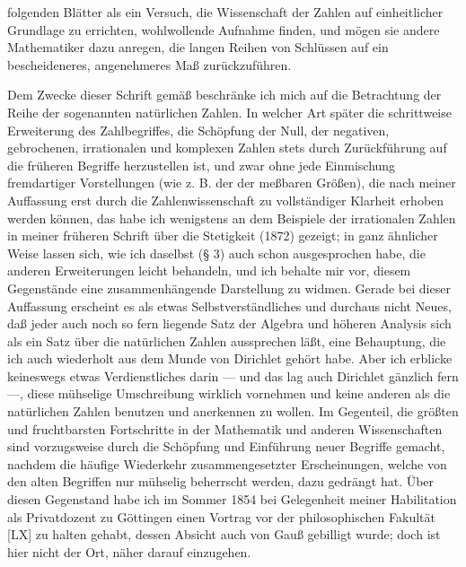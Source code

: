 \documentclass[11pt]{article}
\begin{document}
folgenden Blätter als ein Versuch, die Wissenschaft der Zahlen auf einheitlicher Grundlage zu errichten, wohlwollende Aufnahme finden, und mögen sie andere Mathematiker dazu anregen, die langen Reihen von Schlüssen auf ein bescheideneres, angenehmeres Maß zurückzuführen.

Dem Zwecke dieser Schrift gemäß beschränke ich mich auf die Betrachtung der Reihe der sogenannten natürlichen Zahlen. In welcher Art später die schrittweise Erweiterung des Zahlbegriffes, die Schöpfung der Null, der negativen, gebrochenen, irrationalen und komplexen Zahlen stets durch Zurückführung auf die früheren Begriffe herzustellen ist, und zwar ohne jede Einmischung fremdartiger Vorstellungen (wie z. B. der der meßbaren Größen), die nach meiner Auffassung erst durch die Zahlenwissenschaft zu vollständiger Klarheit erhoben werden können, das habe ich wenigstens an dem Beispiele der irrationalen Zahlen in meiner früheren Schrift über die Stetigkeit (1872) gezeigt; in ganz ähnlicher Weise lassen sich, wie ich daselbst (§ 3) auch schon ausgesprochen habe, die anderen Erweiterungen leicht behandeln, und ich behalte mir vor, diesem Gegenstände eine zusammenhängende Darstellung zu widmen. Gerade bei dieser Auffassung erscheint es als etwas Selbstverständliches und durchaus nicht Neues, daß jeder auch noch so fern liegende Satz der Algebra und höheren Analysis sich als ein Satz über die natürlichen Zahlen aussprechen läßt, eine Behauptung, die ich auch wiederholt aus dem Munde von Dirichlet gehört habe. Aber ich erblicke keineswegs etwas Verdienstliches darin — und das lag auch Dirichlet gänzlich fern —, diese mühselige Umschreibung wirklich vornehmen und keine anderen als die natürlichen Zahlen benutzen und anerkennen zu wollen. Im Gegenteil, die größten und fruchtbarsten Fortschritte in der Mathematik und anderen Wissenschaften sind vorzugsweise durch die Schöpfung und Einführung neuer Begriffe gemacht, nachdem die häufige Wiederkehr zusammengesetzter Erscheinungen, welche von den alten Begriffen nur mühselig beherrscht werden, dazu gedrängt hat. Über diesen Gegenstand habe ich im Sommer 1854 bei Gelegenheit meiner Habilitation als Privatdozent zu Göttingen einen Vortrag vor der philosophischen Fakultät [LX] zu halten gehabt, dessen Absicht auch von Gauß gebilligt wurde; doch ist hier nicht der Ort, näher darauf einzugehen.
\end{document}
